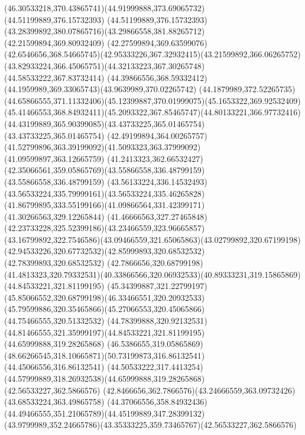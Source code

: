 {{		\curveto(46.30533218,370.43865741)(44.91999888,373.69065732)(44.51199889,376.15732393)
		\curveto(44.51199889,376.15732393)(43.28399892,380.07865716)(43.29866558,381.88265712)
		\lineto(42.21599894,369.80932409)
		\lineto(42.27599894,369.63599076)
		\curveto(42.6546656,368.54665745)(42.95333226,367.32932415)(43.21599892,366.06265752)
		\curveto(43.82933224,366.45065751)(44.32133223,367.30265748)(44.58533222,367.83732414)
		\curveto(44.39866556,368.59332412)(44.1959989,369.33065743)(43.9639989,370.02265742)
		\lineto(44.1879989,372.52265735)
		\curveto(44.65866555,371.11332406)(45.12399887,370.01999075)(45.1653322,369.92532409)
		\curveto(45.41466553,368.84932411)(45.2093322,367.85465747)(44.80133221,366.97732416)
		\curveto(44.43199889,365.90399085)(43.43733225,365.01465754)(43.43733225,365.01465754)
		\curveto(42.49199894,364.00265757)(41.52799896,363.39199092)(41.5093323,363.37999092)
		\lineto(41.09599897,363.12665759)
		\lineto(41.2413323,362.66532427)
		\curveto(42.35066561,359.05865769)(43.55866558,336.48799159)(43.55866558,336.48799159)
		\curveto(43.56133224,336.14532493)(43.56533224,335.79999161)(43.56533224,335.46265828)
		\curveto(41.86799895,333.55199166)(41.09866564,331.42399171)(41.30266563,329.12265844)
		\curveto(41.46666563,327.27465848)(42.23733228,325.52399186)(43.23466559,323.96665857)
		\curveto(43.16799892,322.7546586)(43.09466559,321.65065863)(43.02799892,320.67199198)
		\curveto(42.94533226,320.67732532)(42.85999893,320.68532532)(42.78399893,320.68532532)
		\lineto(42.7866656,320.68799198)
		\curveto(41.4813323,320.79332531)(40.33866566,320.06932533)(40.89333231,319.15865869)
		\moveto(44.84533221,321.81199195)
		\curveto(45.34399887,321.22799197)(45.85066552,320.68799198)(46.33466551,320.20932533)
		\curveto(45.79599886,320.35465866)(45.27066553,320.45065866)(44.75466555,320.51332532)
		\curveto(44.78399888,320.92132531)(44.81466555,321.35999197)(44.84533221,321.81199195)
		\moveto(44.65999888,319.28265868)
		\curveto(46.5386655,319.05865869)(48.66266545,318.10665871)(50.73199873,316.86132541)
		\lineto(44.45066556,316.86132541)
		\curveto(44.50533222,317.4413254)(44.57999889,318.26932538)(44.65999888,319.28265868)
		\moveto(42.56533227,362.5866576)
		\curveto(42.8466656,362.7866576)(43.24666559,363.09732426)(43.68533224,363.49865758)
		\curveto(44.37066556,358.84932436)(44.49466555,351.21065789)(44.45199889,347.28399132)
		\curveto(43.9799989,352.24665786)(43.35333225,359.73465767)(42.56533227,362.5866576)
	}
}